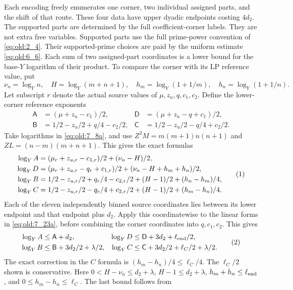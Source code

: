 Each encoding freely enumerates one corner, two individual assigned parts,
and the shift of that route. These four data have upper dyadic endpoints
costing \(4d_2\). The supported parts are determined by the full
coefficient-corner labels. They are not extra free variables. Supported
parts use the full prime-power convention of \eqref{eq:old:2_4}. Their
supported-prime choices are paid by the uniform estimate \eqref{eq:old:6_6}.
Each sum of two assigned-part coordinates is a lower bound for the
base-\(Y\) logarithm of their product.
To compare the corner with its LP reference value, put
\[
\nu_n=\log_Y n,\quad H=\log_Y(m+n+1),\quad
h_m=\log_Y(1+1/m),\quad h_n=\log_Y(1+1/n).
\]
Let subscript \(r\) denote the actual source values of \(\mu,z_u,q,c_1,c_2\).
Define the lower-corner reference exponents
\[
\begin{aligned}
\mathsf A&=(\mu+z_u-c_1)/2,&
\mathsf D&=(\mu+z_u-q+c_1)/2,\\
\mathsf B&=1/2-z_u/2+q/4-c_2/2,&
\mathsf C&=1/2-z_u/2-q/4+c_2/2.
\end{aligned}
\]
Take logarithms in \eqref{eq:old:7_8a}, and use \(Z^2M=m(m+1)n(n+1)\) and
\(ZL=(n-m)(m+n+1)\). This gives the exact formulas
\[
\begin{aligned}
\log_Y A&=(\mu_r+z_{u,r}-c_{1,r})/2+(\nu_n-H)/2,\\
\log_Y D&=(\mu_r+z_{u,r}-q_r+c_{1,r})/2
             +(\nu_n-H+h_m+h_n)/2,\\
\log_Y B&=1/2-z_{u,r}/2+q_r/4-c_{2,r}/2
             +(H-1)/2+(h_n-h_m)/4,\\
\log_Y C&=1/2-z_{u,r}/2-q_r/4+c_{2,r}/2
             +(H-1)/2+(h_m-h_n)/4.
\end{aligned}
\AutoTag{eq:old:7_23a}
\]
Each of the eleven independently binned source coordinates lies between
its lower endpoint and that endpoint plus \(d_2\). Apply this
coordinatewise to the linear forms in \eqref{eq:old:7_23a}, before
combining the corner coordinates into \(q,c_1,c_2\). This gives
\[
\begin{aligned}
\log_YA&\le\mathsf A+d_2,&
\log_YD&\le\mathsf D+3d_2+\ell_{\rm end}/2,\\
\log_YB&\le\mathsf B+3d_2/2+\lambda/2,&
\log_YC&\le\mathsf C+3d_2/2+\ell_C/2+\lambda/2.
\end{aligned}
\AutoTag{eq:old:7_23b}
\]
The exact correction in the \(C\) formula is
\((h_m-h_n)/4\le\ell_C/4\). The \(\ell_C/2\) shown is
conservative.
Here \(0<H-\nu_n\le d_2+\lambda\), \(H-1\le d_2+\lambda\),
\(h_m+h_n\le\ell_{\rm end}\), and
\(0\le h_m-h_n\le\ell_C\). The last bound follows from

